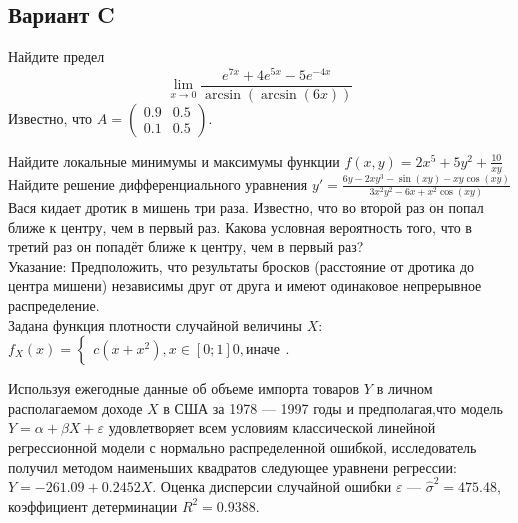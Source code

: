 \documentclass[addpoints, answers]{exam} %
\begin{document}
\subsection{Вариант C}
\begin{questions}
\question Найдите предел
\[
\lim_{x\to 0} \frac{e^{7x}+4e^{5x}-5e^{-4x}}{\arcsin \left(\arcsin(6x)\right)}
\]
\question Известно, что $A=
\left(\begin{array}{cc}
0.9 & 0.5\\
0.1 & 0.5
\end{array}\right)$.
\question Найдите локальные минимумы и максимумы функции $f(x,y)=2x^5+5y^2+\frac{10}{xy}$\\
\question  Найдите решение дифференциального уравнения $y'=\frac{6y-2xy^3-\sin(xy)-xy\cos(xy)}{3x^2y^2-6x+x^2\cos(xy)}$\\
\question  Вася кидает дротик в мишень три раза. Известно, что во второй раз он попал ближе к центру, чем в первый раз. Какова условная вероятность того, что в третий раз он попадёт ближе к центру, чем в первый раз?\\
Указание: Предположить, что результаты бросков (расстояние от дротика до центра мишени) независимы друг от друга и имеют одинаковое непрерывное распределение.\\
\question  Задана функция плотности случайной величины $X$:\\
$f_X(x)=\begin{cases}
c(x+x^2), x \in [0;1]
0, \text{иначе}
\end{cases}$.
\question  Используя ежегодные данные об объеме импорта товаров $Y$ в личном располагаемом доходе $X$ в США за 1978 --- 1997 годы и предполагая,что модель $Y=\alpha+\beta X+\varepsilon$ удовлетворяет всем условиям классической линейной регрессионной модели с нормально распределенной ошибкой, исследователь получил методом наименьших квадратов следующее уравнени регрессии: $Y=-261.09+0.2452X$. Оценка дисперсии случайной ошибки $\varepsilon$ --- $\hat{\sigma}^2=475.48$, коэффициент детерминации $R^2=0.9388$.
\begin{parts}

\end{parts}
\end{questions}
\end{document}

